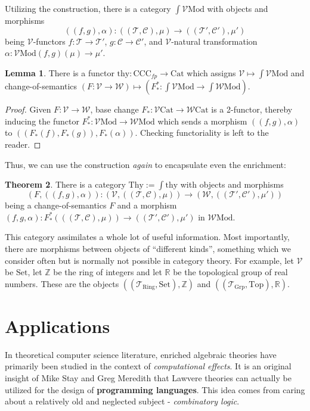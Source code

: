 \documentclass[a4paper,UKenglish]{article}
\theoremstyle{definition}
\newtheorem{theorem}{Theorem}
\newtheorem{lemma}[theorem]{Lemma}
\newcommand{\Set}{\mathrm{Set}}
\newcommand{\Grp}{\mathrm{Grp}}
\newcommand{\Cat}{\mathrm{Cat}}
\newcommand{\Top}{\mathrm{Top}}
\newcommand{\CCC}{\mathrm{CCC}}
\newcommand{\Mod}{\mathrm{Mod}}
\newcommand{\V}{\mathscr{V}}
\newcommand{\W}{\mathscr{W}}
\newcommand{\C}{\mathscr{C}}
\newcommand{\T}{\mathscr{T}}
\begin{document}
Utilizing the construction, there is a category \textbf{$\int \V\Mod$} with objects and morphisms $$((f,g),\alpha): ((\T,\C),\mu) \to ((\T',\C'),\mu')$$ being $\V$-functors $f:\T\to \T'$, $g:\C\to \C'$, and $\V$-natural transformation $\alpha:\V\Mod(f,g)(\mu)\to \mu'$.

\begin{lemma}
	There is a functor $\mathrm{thy}: \CCC_{fp} \to \Cat$ which assigns $\V \mapsto \int \V\Mod$ and change-of-semantics $(F: \V \to \W) \mapsto (F_*^*: \int \V\Mod \to \int \W\Mod)$.
\end{lemma}
\begin{proof}
	Given $F:\V\to \W$, base change $F_*: \V\Cat \to \W\Cat$ is a 2-functor, thereby inducing the functor $F_*^*:\V\Mod\to \W\Mod$ which sends a morphism $((f,g),\alpha)$ to $((F_*(f),F_*(g)),F_*(\alpha))$. Checking functoriality is left to the reader.
\end{proof}

Thus, we can use the construction \textit{again} to encapsulate even the enrichment:
\begin{theorem}
	There is a category $\mathrm{Thy} := \int \mathrm{thy}$ with objects and morphisms $$(F,((f,g),\alpha)): (\V,((\T,\C),\mu)) \to (\W,((\T',\C'),\mu'))$$ being a change-of-semantics $F$ and a morphism $(f,g,\alpha): F_*^*(((\T,\C),\mu)) \to ((\T',\C'),\mu')$ in $\W\Mod$.
\end{theorem}

This category assimilates a whole lot of useful information. Most importantly, there are morphisms between objects of ``different kinds'', something which we consider often but is normally not possible in category theory. For example, let $\V$ be $\Set$, let $\mathbb{Z}$ be the ring of integers and let $\mathbb{R}$ be the topological group of real numbers. These are the objects $((\T_{\mathrm{Ring}},\Set),\mathbb{Z})$ and $((\T_\Grp,\Top),\mathbb{R})$.

\section{Applications}

In theoretical computer science literature, enriched algebraic theories have primarily been studied in the context of \textit{computational effects}. It is an original insight of Mike Stay and Greg Meredith \cite{ladl} that Lawvere theories can actually be utilized for the design of \textbf{programming languages}. This idea comes from caring about a relatively old and neglected subject - \textit{combinatory logic}.
\end{document}
